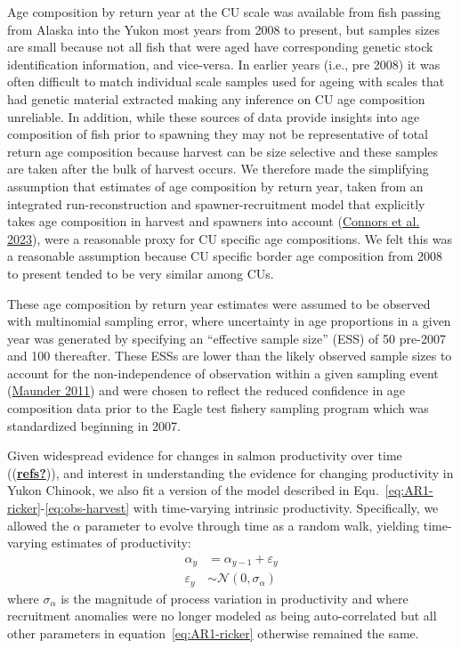 \documentclass[11pt]{book}
\begin{document}
Age composition by return year at the CU scale was available from fish passing from Alaska into the Yukon most years from 2008 to present, but samples sizes are small because not all fish that were aged have corresponding genetic stock identification information, and vice-versa. In earlier years (i.e., pre 2008) it was often difficult to match individual scale samples used for ageing with scales that had genetic material extracted making any inference on CU age composition unreliable. In addition, while these sources of data provide insights into age composition of fish prior to spawning they may not be representative of total return age composition because harvest can be size selective and these samples are taken after the bulk of harvest occurs. We therefore made the simplifying assumption that estimates of age composition by return year, taken from an integrated run-reconstruction and spawner-recruitment model that explicitly takes age composition in harvest and spawners into account (\protect\hyperlink{ref-connors_estimates_2023}{Connors et al. 2023}), were a reasonable proxy for CU specific age compositions. We felt this was a reasonable assumption because CU specific border age composition from 2008 to present tended to be very similar among CUs.

These age composition by return year estimates were assumed to be observed with multinomial sampling error, where uncertainty in age proportions in a given year was generated by specifying an ``effective sample size'' (ESS) of 50 pre-2007 and 100 thereafter. These ESSs are lower than the likely observed sample sizes to account for the non-independence of observation within a given sampling event (\protect\hyperlink{ref-maunder_review_2011}{Maunder 2011}) and were chosen to reflect the reduced confidence in age composition data prior to the Eagle test fishery sampling program which was standardized beginning in 2007.

\hypertarget{time-varying-productivity}{%
\label{time-varying-productivity}}

Given widespread evidence for changes in salmon productivity over time ((\protect\hyperlink{ref-refs}{\textbf{refs?}})), and interest in understanding the evidence for changing productivity in Yukon Chinook, we also fit a version of the model described in Equ.~\ref{eq:AR1-ricker}-\ref{eq:obs-harvest} with time-varying intrinsic productivity. Specifically, we allowed the \(\alpha\) parameter to evolve through time as a random walk, yielding time-varying estimates of productivity:
\begin{equation}
  \begin{aligned}
  \alpha_y &= \alpha_{y-1} + \varepsilon_y \\
  \varepsilon_y &\sim \mathcal{N}(0, \sigma_\alpha)
  \end{aligned}
  \label{eq:tv-alpha}
\end{equation}
where \(\sigma_\alpha\) is the magnitude of process variation in productivity and where recruitment anomalies were no longer modeled as being auto-correlated but all other parameters in equation~\ref{eq:AR1-ricker} otherwise remained the same.
\end{document}
